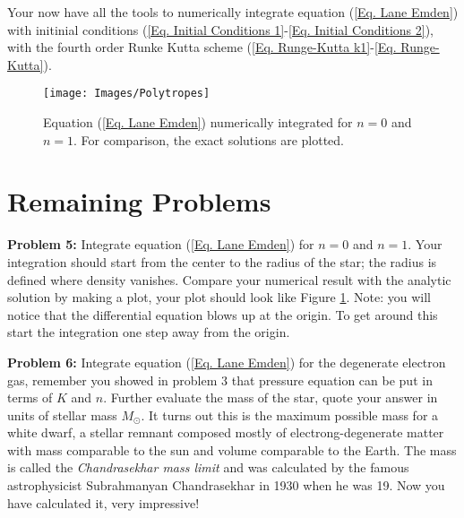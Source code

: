\documentclass{article}
\begin{document}
Your now have all the tools to numerically integrate equation (\ref{Eq. Lane Emden}) with initinial conditions (\ref{Eq. Initial Conditions 1}-\ref{Eq. Initial Conditions 2}), with the fourth order Runke Kutta scheme (\ref{Eq. Runge-Kutta k1}-\ref{Eq. Runge-Kutta}).

\begin{figure}[h!]
\begin{center}
\texttt{[image: Images/Polytropes]}
\end{center}
\caption{Equation (\ref{Eq. Lane Emden}) numerically integrated for $n=0$ and $n=1$. For comparison, the exact solutions are plotted.}
\label{Fig: Polytropes}
\end{figure}

\section{Remaining Problems}
\bigskip
\noindent
\textbf{Problem 5:} Integrate equation (\ref{Eq. Lane Emden}) for $n=0$ and $n=1$. Your integration should start from the center to the radius of the star; the radius is defined where density vanishes. Compare your numerical result with the analytic solution by making a plot, your plot should look like Figure \ref{Fig: Polytropes}. Note: you will notice that the differential equation blows up at the origin. To get around this start the integration one step away from the origin.

\bigskip
\noindent
\textbf{Problem 6:} Integrate equation (\ref{Eq. Lane Emden}) for the degenerate electron gas, remember you showed in problem 3 that pressure equation can be put in terms of $K$ and $n$. Further evaluate the mass of the star, quote your answer in units of stellar mass $M_{\odot}$. It turns out this is the maximum possible mass for a white dwarf, a stellar remnant composed mostly of electrong-degenerate matter with mass comparable to the sun and volume comparable to the Earth. The mass is called the \textit{Chandrasekhar mass limit} and was calculated by the famous astrophysicist Subrahmanyan Chandrasekhar in 1930 when he was 19. Now you have calculated it, very impressive!


\newpage
%

\end{document}

